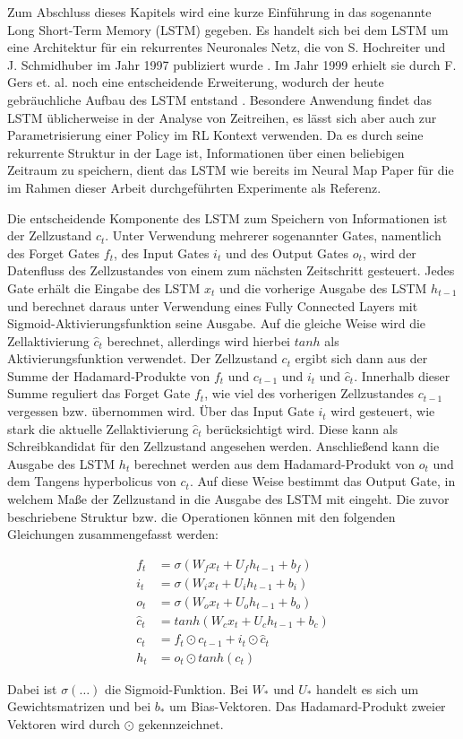 Zum Abschluss dieses Kapitels wird eine kurze Einführung in das sogenannte Long Short-Term Memory (LSTM) gegeben. Es handelt sich bei dem LSTM um eine Architektur für ein rekurrentes Neuronales Netz, die von S. Hochreiter und J. Schmidhuber im Jahr 1997 publiziert wurde \cite{LSTM}. Im Jahr 1999 erhielt sie durch F. Gers et. al. noch eine entscheidende Erweiterung, wodurch der heute gebräuchliche Aufbau des LSTM entstand \cite{ForgetGate}. Besondere Anwendung findet das LSTM üblicherweise in der Analyse von Zeitreihen, es lässt sich aber auch zur Parametrisierung einer Policy im RL Kontext verwenden. Da es durch seine rekurrente Struktur in der Lage ist, Informationen über einen beliebigen Zeitraum zu speichern, dient das LSTM wie bereits im Neural Map Paper für die im Rahmen dieser Arbeit durchgeführten Experimente als Referenz.

Die entscheidende Komponente des LSTM zum Speichern von Informationen ist der Zellzustand $c_t$. Unter Verwendung mehrerer sogenannter Gates, namentlich des Forget Gates $f_t$, des Input Gates $i_t$ und des Output Gates $o_t$, wird der Datenfluss des Zellzustandes von einem zum nächsten Zeitschritt gesteuert. Jedes Gate erhält die Eingabe des LSTM $x_t$ und die vorherige Ausgabe des LSTM $h_{t-1}$ und berechnet daraus unter Verwendung eines Fully Connected Layers mit Sigmoid-Aktivierungsfunktion seine Ausgabe. Auf die gleiche Weise wird die Zellaktivierung $\hat{c}_t$ berechnet, allerdings wird hierbei $tanh$ als Aktivierungsfunktion verwendet. Der Zellzustand $c_t$ ergibt sich dann aus der Summe der Hadamard-Produkte von $f_t$ und $c_{t-1}$ und  $i_t$ und $\hat{c}_t$. Innerhalb dieser Summe reguliert das Forget Gate $f_t$, wie viel des vorherigen Zellzustandes $c_{t-1}$ vergessen bzw. übernommen wird. Über das Input Gate $i_t$ wird gesteuert, wie stark die aktuelle Zellaktivierung $\hat{c}_t$ berücksichtigt wird. Diese kann als Schreibkandidat für den Zellzustand angesehen werden. Anschließend kann die Ausgabe des LSTM $h_t$ berechnet werden aus dem Hadamard-Produkt von $o_t$ und dem Tangens hyperbolicus von $c_t$. Auf diese Weise bestimmt das Output Gate, in welchem Maße der Zellzustand in die Ausgabe des LSTM mit eingeht. Die zuvor beschriebene Struktur bzw. die Operationen können mit den folgenden Gleichungen zusammengefasst werden:

\begin{equation*}
\begin{align*}
	f_t &= \sigma(W_f x_t + U_f h_{t-1} + b_f) \\
	i_t &= \sigma(W_i x_t + U_i h_{t-1} + b_i) \\
	o_t &= \sigma(W_o x_t + U_o h_{t-1} + b_o) \\
	\hat{c}_t &= tanh(W_c x_t + U_c h_{t-1} + b_c) \\
	c_t &= f_t \odot c_{t-1} + i_t \odot \hat{c}_t \\
	h_t &= o_t \odot tanh(c_t)
\end{align*}
\end{equation*}

Dabei ist $\sigma(\dots)$ die Sigmoid-Funktion. Bei $W_*$ und $U_*$ handelt es sich um Gewichtsmatrizen und bei $b_*$ um Bias-Vektoren. Das Hadamard-Produkt zweier Vektoren wird durch $\odot$ gekennzeichnet.
